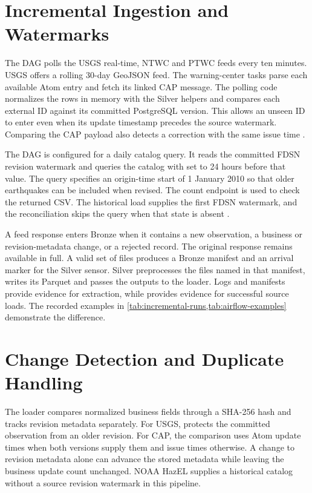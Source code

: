 \documentclass[a4paper,11pt,oneside]{book}
\begin{document}
\section{Incremental Ingestion and Watermarks}
The  DAG polls the USGS real-time, NTWC and PTWC feeds every ten minutes. USGS offers a rolling 30-day GeoJSON feed. The warning-center tasks parse each available Atom entry and fetch its linked CAP message. The polling code normalizes the rows in memory with the Silver helpers and compares each external ID against its committed PostgreSQL version. This allows an unseen ID to enter even when its update timestamp precedes the source watermark. Comparing the CAP payload also detects a correction with the same issue time \cite{airflow,usgsfeed,tsunamigov}.

The  DAG is configured for a daily catalog query. It reads the committed FDSN revision watermark and queries the catalog with  set to 24 hours before that value. The query specifies an origin-time start of 1 January 2010 so that older earthquakes can be included when revised. The count endpoint is used to check the returned CSV. The historical load supplies the first FDSN watermark, and the reconciliation skips the query when that state is absent \cite{usgsfdsn}.

A feed response enters Bronze when it contains a new observation, a business or revision-metadata change, or a rejected record. The original response remains available in full. A valid set of files produces a Bronze manifest and an arrival marker for the Silver sensor. Silver preprocesses the files named in that manifest, writes its Parquet and passes the outputs to the loader. Logs and manifests provide evidence for extraction, while  provides evidence for successful source loads. The recorded examples in \cref{tab:incremental-runs,tab:airflow-examples} demonstrate the difference.

\section{Change Detection and Duplicate Handling}
The loader compares normalized business fields through a SHA-256 hash and tracks revision metadata separately. For USGS,  protects the committed observation from an older revision. For CAP, the comparison uses Atom update times when both versions supply them and issue times otherwise. A change to revision metadata alone can advance the stored metadata while leaving the business update count unchanged. NOAA HazEL supplies a historical catalog without a source revision watermark in this pipeline.
\end{document}
